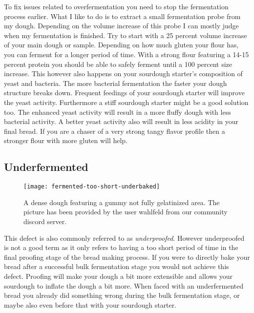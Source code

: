 To fix issues related to overfermentation you need to stop the fermentation process
earlier. What I like to do is to extract a small fermentation probe from my dough.
Depending on the volume increase of this probe I can mostly judge when my fermentation
is finished. Try to start with a 25 percent volume increase of your main dough or sample.
Depending on how much gluten your flour has, you can ferment for a longer period of time.
With a strong flour featuring a 14-15 percent protein you should be able to safely
ferment until a 100 percent size increase. This however also happens on your
sourdough starter's composition of yeast and bacteria. The more bacterial fermentation
the faster your dough structure breaks down. Frequent feedings of your sourdough
starter will improve the yeast activity. Furthermore a stiff sourdough starter
might be a good solution too. The enhanced yeast activity will result in a more fluffy
dough with less bacterial activity. A better yeast activity also will result
in less acidity in your final bread. If you are a chaser of a very strong tangy
flavor profile then a stronger flour with more gluten will help.


\subsection{Underfermented}

\begin{figure}
  \texttt{[image: fermented-too-short-underbaked]}
  \caption{A dense dough featuring a gummy not fully gelatinized area.
  The picture has been provided by the user wahlfeld from our community discord server.}
  \label{fig:fermented-too-short-underbaked}
\end{figure}

This defect is also commonly referred to as {\it underproofed}. However underproofed
is not a good term as it only refers to having a too short period of time in the final
proofing stage of the bread making process. If you were to directly bake your bread
after a successful bulk fermentation stage you would not achieve this defect.
Proofing will make your dough a bit more extensible and allows your sourdough
to inflate the dough a bit more. When faced with an underfermented bread you
already did something wrong during the bulk fermentation stage, or maybe also
even before that with your sourdough starter.

